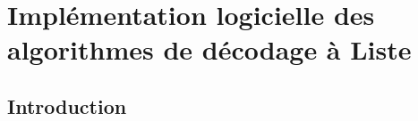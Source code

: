 \chapter{Implémentation logicielle des algorithmes de décodage à Liste} %


\vspace*{\fill}
\minitocTITI
\vspace*{\fill}
\newpage


\section{Introduction}

\begin{figure}[t]
  \centering
  \quad\quad
\end{figure}
